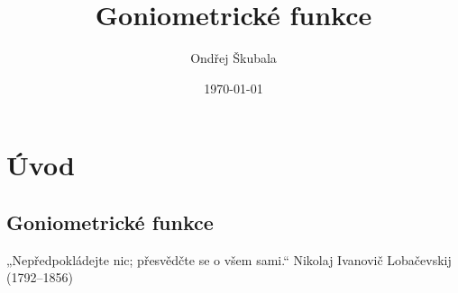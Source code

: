 \documentclass[12pt,a4paper]{article}
\title{Goniometrické funkce}
\author{Ondřej Škubala}
\date{\today}
\begin{document}
\maketitle
\newpage

\section{Úvod}

\subsection*{Goniometrické funkce}

\begin{quotebox}
{„Nepředpokládejte nic; přesvědčte se o všem sami.“}
{Nikolaj Ivanovič Lobačevskij (1792–1856)}
\end{quotebox}
\end{document}
